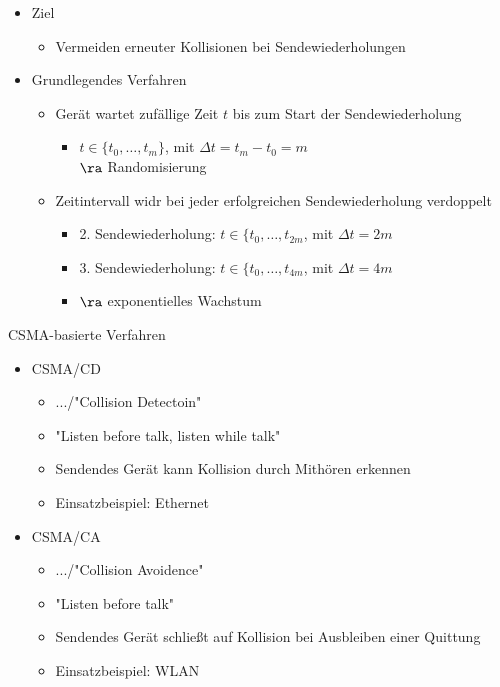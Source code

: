       \begin{itemize}
        \item Ziel
          \begin{itemize}
            \item Vermeiden erneuter Kollisionen bei Sendewiederholungen
          \end{itemize}
        \item Grundlegendes Verfahren
          \begin{itemize}
            \item Gerät wartet zufällige Zeit $t$ bis zum Start der Sendewiederholung
              \begin{itemize}
                \item $t\in\{t_0,\dots,t_m\}$, mit $\Delta t=t_m-t_0=m$\\
                  $\ra$ Randomisierung
              \end{itemize}
            \item Zeitintervall widr bei jeder erfolgreichen Sendewiederholung verdoppelt
              \begin{itemize}
                \item 2. Sendewiederholung: $t\in\{t_0,\dots,t_{2m}$, mit $\Delta t=2m$
                \item 3. Sendewiederholung: $t\in\{t_0,\dots,t_{4m}$, mit $\Delta t=4m$
                  \item $\ra$ exponentielles Wachstum
              \end{itemize}
          \end{itemize}
      \end{itemize}
      CSMA-basierte Verfahren
      \begin{itemize}
        \item CSMA/CD
          \begin{itemize}
            \item .../"Collision Detectoin"
            \item "Listen before talk, listen while talk"
            \item Sendendes Gerät kann Kollision durch Mithören erkennen
            \item Einsatzbeispiel: Ethernet
          \end{itemize}
        \item CSMA/CA
          \begin{itemize}
            \item .../"Collision Avoidence"
            \item "Listen before talk"
            \item Sendendes Gerät schließt auf Kollision bei Ausbleiben einer Quittung
            \item Einsatzbeispiel: WLAN
          \end{itemize}
      \end{itemize}
